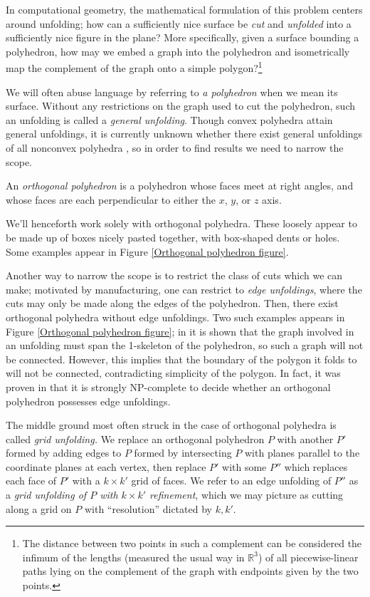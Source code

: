 \documentclass{article}
\begin{document}
In computational geometry, the mathematical formulation of this problem centers around unfolding; how can a sufficiently nice surface be \emph{cut} and \emph{unfolded} into a sufficiently nice figure in the plane?
More specifically, given a surface bounding a polyhedron, how may we embed a graph into the polyhedron and isometrically map the complement of the graph onto a simple polygon?\footnote{The distance between two points in such a complement can be considered the infimum of the lengths (measured the usual way in $\mathbb{R}^3$) of all piecewise-linear paths lying on the complement of the graph with endpoints given by the two points.} 

We will often abuse language by referring to \emph{a polyhedron} when we mean its surface.
Without any restrictions on the graph used to cut the polyhedron, such an unfolding is called a \emph{general unfolding}.
Though convex polyhedra attain general unfoldings, it is currently unknown whether there exist general unfoldings of all nonconvex polyhedra \cite{Demaine_textbook}, so in order to find results we need to narrow the scope.

\begin{definition}
  An \emph{orthogonal polyhedron} is a polyhedron whose faces meet at right angles, and whose faces are each perpendicular to either the $x$, $y$, or $z$ axis.
\end{definition}
We'll henceforth work solely with orthogonal polyhedra.
These loosely appear to be made up of boxes nicely pasted together, with box-shaped dents or holes.
Some examples appear in Figure \ref{Orthogonal polyhedron figure}.


Another way to narrow the scope is to restrict the class of cuts which we can make;
motivated by manufacturing, one can restrict to \emph{edge unfoldings}, where the cuts may only be made along the edges of the polyhedron.
Then, there exist orthogonal polyhedra without edge unfoldings. 
Two such examples appears in Figure \ref{Orthogonal polyhedron figure}; 
in \cite{Demaine_textbook} it is shown that the graph involved in an unfolding must span the 1-skeleton of the polyhedron, so such a graph will not be connected.
However, this implies that the boundary of the polygon it folds to will not be connected, contradicting simplicity of the polygon.
In fact, it was proven in \cite{Abel_Demaine} that it is strongly NP-complete to decide whether an orthogonal polyhedron possesses edge unfoldings.


The middle ground most often struck in the case of orthogonal polyhedra is called \emph{grid unfolding.}
We replace an orthogonal polyhedron $P$ with another $P'$ formed by adding edges to $P$ formed by intersecting $P$ with planes parallel to the coordinate planes at each vertex, then replace $P'$ with some $P''$ which replaces each face of $P'$ with a $k \times k'$ grid of faces.
We refer to an edge unfolding of $P''$ as a \emph{grid unfolding of $P$ with $k \times k'$ refinement}, which we may picture as cutting along a grid on $P$ with ``resolution'' dictated by $k,k'$.
\end{document}
